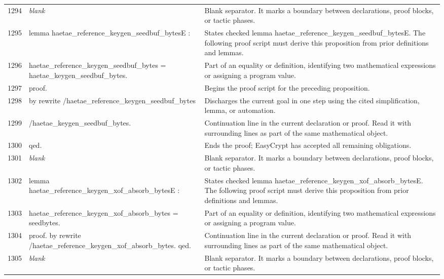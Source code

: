 \documentclass[10pt]{article}
\begin{document}
\begin{longtable}{r L{0.53\textwidth} L{0.37\textwidth}}
1294 & {\ttfamily\scriptsize \emph{blank}} & Blank separator.  It marks a boundary between declarations, proof blocks, or tactic phases. \\
1295 & {\ttfamily\scriptsize lemma haetae\_reference\_keygen\_seedbuf\_bytesE :} & States checked lemma haetae\_reference\_keygen\_seedbuf\_bytesE.  The following proof script must derive this proposition from prior definitions and lemmas. \\
1296 & {\ttfamily\scriptsize   haetae\_reference\_keygen\_seedbuf\_bytes = haetae\_keygen\_seedbuf\_bytes.} & Part of an equality or definition, identifying two mathematical expressions or assigning a program value. \\
1297 & {\ttfamily\scriptsize proof.} & Begins the proof script for the preceding proposition. \\
1298 & {\ttfamily\scriptsize by rewrite /haetae\_reference\_keygen\_seedbuf\_bytes} & Discharges the current goal in one step using the cited simplification, lemma, or automation. \\
1299 & {\ttfamily\scriptsize            /haetae\_keygen\_seedbuf\_bytes.} & Continuation line in the current declaration or proof.  Read it with surrounding lines as part of the same mathematical object. \\
1300 & {\ttfamily\scriptsize qed.} & Ends the proof; EasyCrypt has accepted all remaining obligations. \\
1301 & {\ttfamily\scriptsize \emph{blank}} & Blank separator.  It marks a boundary between declarations, proof blocks, or tactic phases. \\
1302 & {\ttfamily\scriptsize lemma haetae\_reference\_keygen\_xof\_absorb\_bytesE :} & States checked lemma haetae\_reference\_keygen\_xof\_absorb\_bytesE.  The following proof script must derive this proposition from prior definitions and lemmas. \\
1303 & {\ttfamily\scriptsize   haetae\_reference\_keygen\_xof\_absorb\_bytes = seedbytes.} & Part of an equality or definition, identifying two mathematical expressions or assigning a program value. \\
1304 & {\ttfamily\scriptsize proof. by rewrite /haetae\_reference\_keygen\_xof\_absorb\_bytes. qed.} & Continuation line in the current declaration or proof.  Read it with surrounding lines as part of the same mathematical object. \\
1305 & {\ttfamily\scriptsize \emph{blank}} & Blank separator.  It marks a boundary between declarations, proof blocks, or tactic phases. \\

\end{longtable}
\end{document}
